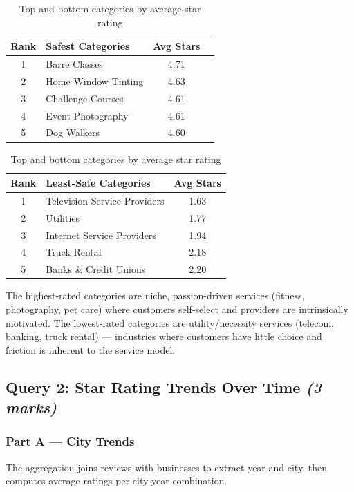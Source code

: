 \documentclass[12pt,a4paper]{article}
\newcommand{\marks}[1]{\hfill\textit{(#1 marks)}}
\begin{document}
\begin{table}[H]
  \centering
  \begin{tabular}{clcl}
    \toprule
    \textbf{Rank} & \textbf{Safest Categories} & \textbf{Avg Stars} \\
    \midrule
    1 & Barre Classes           & 4.71 \\
    2 & Home Window Tinting     & 4.63 \\
    3 & Challenge Courses       & 4.61 \\
    4 & Event Photography       & 4.61 \\
    5 & Dog Walkers             & 4.60 \\
    \bottomrule
  \end{tabular}
  \quad
  \begin{tabular}{clc}
    \toprule
    \textbf{Rank} & \textbf{Least-Safe Categories} & \textbf{Avg Stars} \\
    \midrule
    1 & Television Service Providers & 1.63 \\
    2 & Utilities                    & 1.77 \\
    3 & Internet Service Providers   & 1.94 \\
    4 & Truck Rental                 & 2.18 \\
    5 & Banks \& Credit Unions       & 2.20 \\
    \bottomrule
  \end{tabular}
  \caption{Top and bottom categories by average star rating}
\end{table}

The highest-rated categories are niche, passion-driven services (fitness,
photography, pet care) where customers self-select and providers are
intrinsically motivated. The lowest-rated categories are utility/necessity
services (telecom, banking, truck rental) --- industries where customers have
little choice and friction is inherent to the service model.

\subsection{Query 2: Star Rating Trends Over Time \marks{3}}

\subsubsection*{Part A --- City Trends}

The aggregation joins reviews with businesses to extract year and city, then
computes average ratings per city-year combination.
\end{document}
